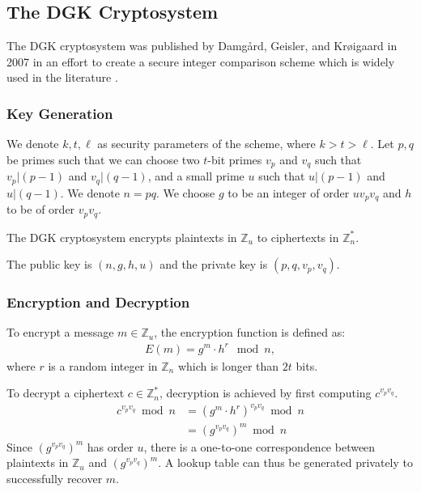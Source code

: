 \subsection{The DGK Cryptosystem}
The DGK cryptosystem was published by Damgård, Geisler, and Krøigaard in 2007 in an effort to create a secure integer comparison scheme \cite{pieprzyk_efficient_2007, cryptoeprint:2008:321} which is widely used in the literature \cite{veugen_improving_2012}.

\subsubsection{Key Generation}
We denote $k,t,\ell$ as security parameters of the scheme, where $k>t>\ell$.
Let $p,q$ be primes such that
we can choose two $t$-bit primes $v_p$ and $v_q$ such that $v_p | (p-1)$ and $v_q | (q-1)$, and a small prime $u$ such that $u | (p-1)$ and $u | (q-1)$.
We denote $n = pq$.
We choose $g$ to be an integer of order $uv_pv_q$ and $h$ to be of order $v_pv_q$.

The DGK cryptosystem encrypts plaintexts in $\mathbb{Z}_u$ to ciphertexts in $\mathbb{Z}_n^\ast$.

The public key is $(n,g,h,u)$ and the private key is $(p,q,v_p,v_q)$.

\subsubsection{Encryption and Decryption}
To encrypt a message $m \in \mathbb{Z}_u$, the encryption function is defined as:
\begin{align*}
  E(m) = g^m \cdot h^r \mod{n},
\end{align*}
where $r$ is a random integer in $\mathbb{Z}_n$ which is longer than $2t$ bits.

To decrypt a ciphertext $c \in \mathbb{Z}_n^\ast$, decryption is achieved by first computing $c^{v_pv_q}$.
\begin{align*}
	c^{v_pv_q} \bmod n
	&= (g^m \cdot h^r)^{v_pv_q} \bmod n\\
	&= (g^{v_pv_q})^m \bmod n
\end{align*}
Since $(g^{v_pv_q})^m$ has order $u$, there is a one-to-one correspondence between plaintexts in $\mathbb{Z}_u$ and  $(g^{v_pv_q})^m$. A lookup table can thus be generated privately to successfully recover $m$.

